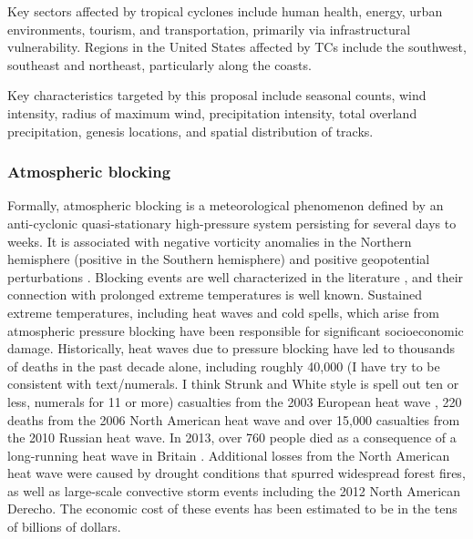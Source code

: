 \documentclass[11pt]{article}
\newcommand\citep{\cite}
\begin{document}


Key sectors affected by tropical cyclones include {\color{blue}human health,} energy, urban environments, {\color{blue}tourism}, and transportation, primarily via infrastructural vulnerability.  Regions {\color{blue}in the United States} affected by TCs include the southwest, southeast and northeast, particularly along the coasts.

Key characteristics targeted by this proposal include seasonal counts, wind intensity, radius of maximum wind, precipitation intensity, total overland precipitation, {\color{blue}genesis locations}, and spatial distribution of tracks.

\subsubsection*{Atmospheric blocking}

Formally, atmospheric blocking is a meteorological phenomenon defined by an anti-cyclonic quasi-stationary high-pressure system persisting for several days to weeks. {\color{blue}It} is associated with negative vorticity anomalies in the Northern hemisphere (positive in the Southern hemisphere) and positive geopotential perturbation{\color{blue}s} .  Blocking events are well characterized in the literature \citep{benzi1986anomalous}, and their connection with prolonged extreme temperatures is well known.  Sustained extreme temperatures, including heat waves and cold spells, which arise from atmospheric pressure blocking have been responsible for significant socioeconomic damage.  Historically, heat waves due to pressure blocking have led to thousands of deaths {\color{blue}in the past decade alone}, including roughly {\color{blue}40,000 (I have try to be consistent with text/numerals. I think Strunk and White style is spell out ten or less, numerals for 11 or more)}  casualties from the 2003 European heat wave \citep{bouchama20042003}, 220 deaths from the 2006 North American heat wave and over {\color{blue}15,000}  casualties from the 2010 Russian heat wave.  In 2013, over 760 people died as a consequence of a long-running heat wave in Britain \citep{upi2013article}.  Additional losses from the North American heat wave were caused by drought conditions that spurred widespread forest fires, as well as large-scale convective storm events including the 2012 North American Derecho.  The economic cost of these events has been estimated to be in the tens of billions of dollars.
\end{document}
